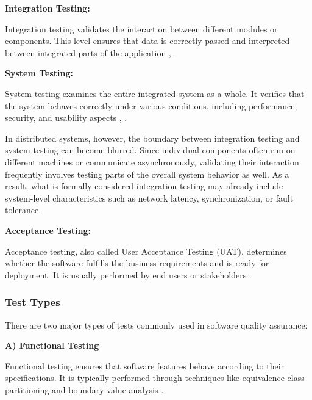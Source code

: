 \vspace{1em}
\textbf{Integration Testing:}

\vspace{0.4em}
Integration testing validates the interaction between different modules or components. This level ensures that data is correctly passed and interpreted between integrated parts of the application \cite{burnstein2003practical}, \cite{spillner2019softwaretest}.

\newpage

\textbf{System Testing:}

\vspace{0.4em}
System testing examines the entire integrated system as a whole. It verifies that the system behaves correctly under various conditions, including performance, security, and usability aspects \cite{myers2011art}, \cite{spillner2019softwaretest}.

\vspace{1em}
In distributed systems, however, the boundary between integration testing and system testing can become blurred. Since individual components often run on different machines or communicate asynchronously, validating their interaction frequently involves testing parts of the overall system behavior as well. As a result, what is formally considered integration testing may already include system-level characteristics such as network latency, synchronization, or fault tolerance.

\vspace{1em}
\textbf{Acceptance Testing:}

\vspace{0.4em}
Acceptance testing, also called User Acceptance Testing (UAT), determines whether the software fulfills the business requirements and is ready for deployment. It is usually performed by end users or stakeholders \cite{kaner1999testing}.
\vspace{0.2em}

\subsubsection{Test Types}

There are two major types of tests commonly used in software quality assurance:

\vspace{1em}
\textbf{A) Functional Testing}

\vspace{0.4em}
Functional testing ensures that software features behave according to their specifications. It is typically performed through techniques like equivalence class partitioning and boundary value analysis \cite{pressman2014software}.

